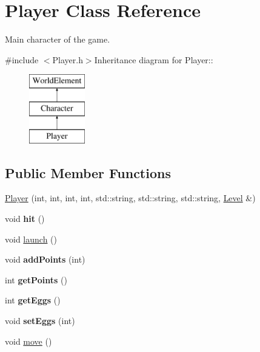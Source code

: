 \hypertarget{classPlayer}{
\section{Player Class Reference}
\label{classPlayer}
}


Main character of the game.  


{\ttfamily \#include $<$Player.h$>$}Inheritance diagram for Player::\begin{figure}[H]
\begin{center}
\leavevmode
\includegraphics[height=3cm]{classPlayer}
\end{center}
\end{figure}
\subsection*{Public Member Functions}
\begin{DoxyCompactItemize}
\item 
\hyperlink{classPlayer_ae3c70b075d5da30ada86473920ddbb2d}{Player} (int, int, int, int, std::string, std::string, std::string, \hyperlink{classLevel}{Level} \&)
\item 
\hypertarget{classPlayer_ad83c5e93ef8b148c2eb0f1aa6349bc6a}{
void {\bfseries hit} ()}
\label{classPlayer_ad83c5e93ef8b148c2eb0f1aa6349bc6a}

\item 
void \hyperlink{classPlayer_a4fe8735a8d96bee2227f9c175c860429}{launch} ()
\item 
\hypertarget{classPlayer_ac40e79c61de10b533e1a509206e59383}{
void {\bfseries addPoints} (int)}
\label{classPlayer_ac40e79c61de10b533e1a509206e59383}

\item 
\hypertarget{classPlayer_ab98ee3c0e10f7b2b65ad43b2a2929445}{
int {\bfseries getPoints} ()}
\label{classPlayer_ab98ee3c0e10f7b2b65ad43b2a2929445}

\item 
\hypertarget{classPlayer_ad79773e699f73e0f59311d5313d0ad30}{
int {\bfseries getEggs} ()}
\label{classPlayer_ad79773e699f73e0f59311d5313d0ad30}

\item 
\hypertarget{classPlayer_a4394cba91e440bd55603fcc6e5ab24ce}{
void {\bfseries setEggs} (int)}
\label{classPlayer_a4394cba91e440bd55603fcc6e5ab24ce}

\item 
void \hyperlink{classPlayer_ae02ee46d8c20dd0697b975f935b09839}{move} ()
\end{DoxyCompactItemize}


